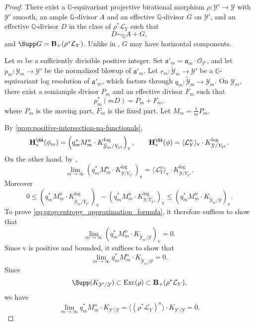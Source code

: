\documentclass[11pt,a4paper]{article}
\begin{document}
\begin{proof}
There exist a $\mathbb{G}$-equivariant projective birational morphism $\rho\colon\mathcal{Y}'\to\mathcal{Y}$ with $\mathcal Y'$ smooth, an ample $\mathbb{Q}$-divisor $A$ and an effective $\mathbb{Q}$-divisor $G$ on $\mathcal{Y}'$, and an effective $\mathbb{Q}$-divisor $D$ in the class of $\rho^*\mathcal{L}_Y$ such that
    \[
        D\sim_{\mathbb{Q}}A+G,
    \]
    and $\Supp G = \mathbf{B}_+(\rho^*\mathcal{L}_Y)$. Unlike in \cite[Appendix~A]{T26App}, $G$ may have horizontal components.


Let $m$ be a sufficiently divisible positive integer. Set $\mathfrak{a}'_m = \mathfrak{a}_m\cdot\mathcal{O}_{\mathcal{Y}'}$, and let $p_m\colon \mathcal{Y}_m\rightarrow \mathcal{Y}'$ be the normalized blowup of $\mathfrak{a}'_m$. Let $r_m\colon \tilde{\mathcal{Y}}_m\rightarrow \mathcal{Y'}$ be a $\mathbb{G}$-equivariant log resolution of $\mathfrak{a}'_m$, which factors through $q_m\colon \tilde{\mathcal{Y}}_m\rightarrow \mathcal{Y}_m$. On $\mathcal{Y}_m$, there exist a semiample divisor $P_m$ and an effective divisor $F_m$ such that
\[
    p_m^*(mD) = P_m+F_m,
\]
where $P_m$ is the moving part, $F_m$ is the fixed part. Let $M_m = \frac{1}{m}P_m$.

By \cref{prop:positive-intersection-na-functionals},
\[
    \mathbf{H}^{\NA}_{\mathrm{v}}(\phi_m) = \left(q_m^*M_m^n\cdot K^{\log}_{\tilde{\mathcal{Y}}_m/Y_{\mathbb{{P}}^1}}\right)_{\mathrm{v}}, \qquad \mathbf{H}^{\NA}_{\mathrm{v}}(\phi) = \langle \mathcal{L}_Y^n\rangle_{\mathrm{v}}\cdot  K^{\log}_{\mathcal{Y}/Y_{\mathbb{P}^1}}.
\]
On the other hand, by \cite[Proposition~4.1]{HL25},
\[
    \lim_{m\to\infty}\left(q_m^*M_m^n\cdot K^{\log}_{{\mathcal{Y}}/Y_{\mathbb{P}^1}}\right)_{\mathrm{v}} = \langle \mathcal{L}_Y^n\rangle_{\mathrm{v}}\cdot K^{\log}_{\mathcal{Y}/Y_{\mathbb{P}^1}}.
\]
Moreover
\[
    0\leq \left(q_m^*M_m^n\cdot K^{\log}_{\tilde{\mathcal{Y}}_m/Y_{\mathbb{{P}}^1}}\right)_{\mathrm{v}}- \left(q_m^*M_m^n\cdot K^{\log}_{{\mathcal{Y}}/Y_{\mathbb{P}^1}}\right)_{\mathrm{v}} \leq \left( q_m^*M_m^n\cdot K_{\tilde{\mathcal{Y}}_m/\mathcal{Y}} \right)_{\mathrm{v}}.
\]
To prove \eqref{eq:prop:entropy_approximation_formula}, it therefore suffices to show that
\[
    \lim_{m\to\infty}\left( q_m^*M_m^n\cdot K_{\tilde{\mathcal{Y}}_m/\mathcal{Y}} \right)_{\mathrm{v}} = 0.
\]
Since $\mathrm{v}$ is positive and bounded, it suffices to show that
\[
    \lim_{m\to\infty} q_m^*M_m^n\cdot K_{\tilde{\mathcal{Y}}_m/\mathcal{Y}}  = 0.
\]
Since 
\[
    \Supp (K_{\mathcal{Y}'/\mathcal{Y}}) \subset \operatorname{Exc}(\rho) \subset \mathbf{B}_+(\rho^*\mathcal{L}_Y),
\]
we have
\[
     \lim_{m\to\infty}q_m^*M_m^n\cdot K_{\mathcal{Y}'/\mathcal{Y}} = \langle (\rho^*\mathcal{L}_Y)^n\rangle\cdot K_{\mathcal{Y}'/\mathcal{Y}} = 0.
\]


\end{proof}
\end{document}

